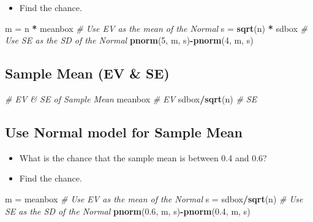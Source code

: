 \documentclass[]{article}
\newenvironment{Shaded}{\begin{snugshade}}{\end{snugshade}}
\newcommand{\CommentTok}[1]{\textcolor[rgb]{0.56,0.35,0.01}{\textit{#1}}}
\newcommand{\DecValTok}[1]{\textcolor[rgb]{0.00,0.00,0.81}{#1}}
\newcommand{\FloatTok}[1]{\textcolor[rgb]{0.00,0.00,0.81}{#1}}
\newcommand{\KeywordTok}[1]{\textcolor[rgb]{0.13,0.29,0.53}{\textbf{#1}}}
\newcommand{\NormalTok}[1]{#1}
\newcommand{\OperatorTok}[1]{\textcolor[rgb]{0.81,0.36,0.00}{\textbf{#1}}}
\newcommand{\StringTok}[1]{\textcolor[rgb]{0.31,0.60,0.02}{#1}}
\providecommand{\tightlist}{%
  \setlength{\itemsep}{0pt}\setlength{\parskip}{0pt}}
\begin{document}
\begin{itemize}
\tightlist
\item
  Find the chance.
\end{itemize}

\begin{Shaded}
\begin{Highlighting}[]
\NormalTok{m =}\StringTok{ }\NormalTok{n }\OperatorTok{*}\StringTok{ }\NormalTok{meanbox  }\CommentTok{# Use EV as the mean of the Normal}
\NormalTok{s =}\StringTok{ }\KeywordTok{sqrt}\NormalTok{(n) }\OperatorTok{*}\StringTok{ }\NormalTok{sdbox   }\CommentTok{# Use SE as the SD of the Normal}
\KeywordTok{pnorm}\NormalTok{(}\DecValTok{5}\NormalTok{, m, s)}\OperatorTok{-}\KeywordTok{pnorm}\NormalTok{(}\DecValTok{4}\NormalTok{, m, s)}
\end{Highlighting}
\end{Shaded}

\hypertarget{sample-mean-ev-se}{%
\subsection{Sample Mean (EV \& SE)}\label{sample-mean-ev-se}}

\begin{Shaded}
\begin{Highlighting}[]
\CommentTok{# EV & SE of Sample Mean}
\NormalTok{meanbox  }\CommentTok{# EV}
\NormalTok{sdbox}\OperatorTok{/}\KeywordTok{sqrt}\NormalTok{(n)  }\CommentTok{# SE}
\end{Highlighting}
\end{Shaded}

\hypertarget{use-normal-model-for-sample-mean}{%
\subsection{Use Normal model for Sample Mean}\label{use-normal-model-for-sample-mean}}

\begin{itemize}
\item
  What is the chance that the sample mean is between 0.4 and 0.6?
\item
  Find the chance.
\end{itemize}

\begin{Shaded}
\begin{Highlighting}[]
\NormalTok{m =}\StringTok{ }\NormalTok{meanbox  }\CommentTok{# Use EV as the mean of the Normal}
\NormalTok{s =}\StringTok{ }\NormalTok{sdbox}\OperatorTok{/}\KeywordTok{sqrt}\NormalTok{(n)  }\CommentTok{# Use SE as the SD of the Normal}
\KeywordTok{pnorm}\NormalTok{(}\FloatTok{0.6}\NormalTok{, m, s)}\OperatorTok{-}\KeywordTok{pnorm}\NormalTok{(}\FloatTok{0.4}\NormalTok{, m, s)}
\end{Highlighting}
\end{Shaded}
\end{document}
